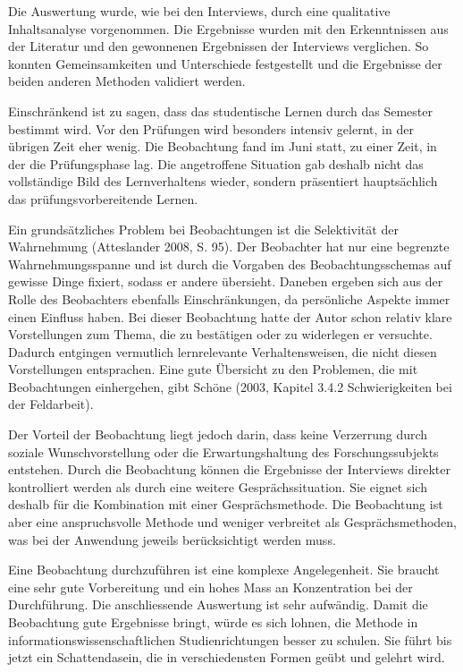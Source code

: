 \documentclass[a4paper,
fontsize=11pt,
oneside,
numbers=noperiodatend,
parskip=half-,
bibliography=totoc,
final
]{scrartcl}
\begin{document}
Die Auswertung wurde, wie bei den Interviews, durch eine qualitative
Inhaltsanalyse vorgenommen. Die Ergebnisse wurden mit den Erkenntnissen
aus der Literatur und den gewonnenen Ergebnissen der Interviews
verglichen. So konnten Gemeinsamkeiten und Unterschiede festgestellt und
die Ergebnisse der beiden anderen Methoden validiert werden.

Einschränkend ist zu sagen, dass das studentische Lernen durch das
Semester bestimmt wird. Vor den Prüfungen wird besonders intensiv
gelernt, in der übrigen Zeit eher wenig. Die Beobachtung fand im Juni
statt, zu einer Zeit, in der die Prüfungsphase lag. Die angetroffene
Situation gab deshalb nicht das vollständige Bild des Lernverhaltens
wieder, sondern präsentiert hauptsächlich das prüfungsvorbereitende
Lernen.

Ein grundsätzliches Problem bei Beobachtungen ist die Selektivität der
Wahrnehmung (Atteslander 2008, S. 95). Der Beobachter hat nur eine
begrenzte Wahrnehmungsspanne und ist durch die Vorgaben des
Beobachtungsschemas auf gewisse Dinge fixiert, sodass er andere
übersieht. Daneben ergeben sich aus der Rolle des Beobachters ebenfalls
Einschränkungen, da persönliche Aspekte immer einen Einfluss haben. Bei
dieser Beobachtung hatte der Autor schon relativ klare Vorstellungen zum
Thema, die zu bestätigen oder zu widerlegen er versuchte. Dadurch
entgingen vermutlich lernrelevante Verhaltensweisen, die nicht diesen
Vorstellungen entsprachen. Eine gute Übersicht zu den Problemen, die mit
Beobachtungen einhergehen, gibt Schöne (2003, Kapitel 3.4.2
Schwierigkeiten bei der Feldarbeit).

Der Vorteil der Beobachtung liegt jedoch darin, dass keine Verzerrung
durch soziale Wunschvorstellung oder die Erwartungshaltung des
Forschungssubjekts entstehen. Durch die Beobachtung können die
Ergebnisse der Interviews direkter kontrolliert werden als durch eine
weitere Gesprächssituation. Sie eignet sich deshalb für die Kombination
mit einer Gesprächsmethode. Die Beobachtung ist aber eine anspruchsvolle
Methode und weniger verbreitet als Gesprächsmethoden, was bei der
Anwendung jeweils berücksichtigt werden muss.

Eine Beobachtung durchzuführen ist eine komplexe Angelegenheit. Sie
braucht eine sehr gute Vorbereitung und ein hohes Mass an Konzentration
bei der Durchführung. Die anschliessende Auswertung ist sehr aufwändig.
Damit die Beobachtung gute Ergebnisse bringt, würde es sich lohnen, die
Methode in informationswissenschaftlichen Studienrichtungen besser zu
schulen. Sie führt bis jetzt ein Schattendasein, die in verschiedensten
Formen geübt und gelehrt wird.
\end{document}
